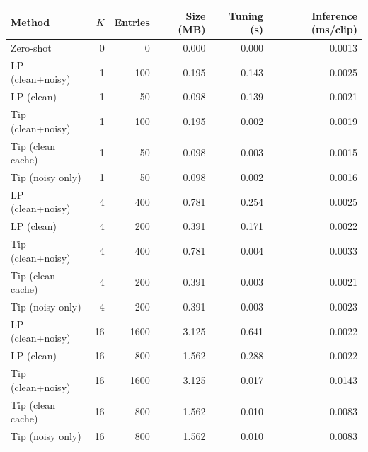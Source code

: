 \begin{tabular}{lrrrrr}
\toprule
Method & $K$ & Entries & Size (MB) & Tuning (s) & Inference (ms/clip) \\
\midrule
Zero-shot & 0 & 0 & 0.000 & 0.000 & 0.0013 \\
LP (clean+noisy) & 1 & 100 & 0.195 & 0.143 & 0.0025 \\
LP (clean) & 1 & 50 & 0.098 & 0.139 & 0.0021 \\
Tip (clean+noisy) & 1 & 100 & 0.195 & 0.002 & 0.0019 \\
Tip (clean cache) & 1 & 50 & 0.098 & 0.003 & 0.0015 \\
Tip (noisy only) & 1 & 50 & 0.098 & 0.002 & 0.0016 \\
LP (clean+noisy) & 4 & 400 & 0.781 & 0.254 & 0.0025 \\
LP (clean) & 4 & 200 & 0.391 & 0.171 & 0.0022 \\
Tip (clean+noisy) & 4 & 400 & 0.781 & 0.004 & 0.0033 \\
Tip (clean cache) & 4 & 200 & 0.391 & 0.003 & 0.0021 \\
Tip (noisy only) & 4 & 200 & 0.391 & 0.003 & 0.0023 \\
LP (clean+noisy) & 16 & 1600 & 3.125 & 0.641 & 0.0022 \\
LP (clean) & 16 & 800 & 1.562 & 0.288 & 0.0022 \\
Tip (clean+noisy) & 16 & 1600 & 3.125 & 0.017 & 0.0143 \\
Tip (clean cache) & 16 & 800 & 1.562 & 0.010 & 0.0083 \\
Tip (noisy only) & 16 & 800 & 1.562 & 0.010 & 0.0083 \\
\bottomrule
\end{tabular}
